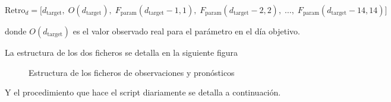 \documentclass[
  10pt,
  a4paper,
  DIV=11,
  numbers=noendperiod,
  open=any]{scrreprt}
\numberwithin{equation}{chapter}
\numberwithin{equation}{section}
\renewcommand{\[}{\begin{equation}}
\renewcommand{\]}{\end{equation}}
\begin{document}
\begin{equation}
\text{Retro}_d = \bigl[ d_{\text{target}},\; O(d_{\text{target}}),\; F_{\text{param}}(d_{\text{target}}-1,1),\; F_{\text{param}}(d_{\text{target}}-2,2),\; \dots,\; F_{\text{param}}(d_{\text{target}}-14,14) \bigr]
\end{equation}

donde \(O(d_{\text{target}})\) es el valor observado real para el
parámetro en el día objetivo.

La estructura de los dos ficheros se detalla en la siguiente figura


\begin{figure}[h]
  \centering
  \caption{Estructura de los ficheros de observaciones y pronósticos}
\end{figure}

Y el procedimiento que hace el script diariamente se detalla a
continuación.
\end{document}

